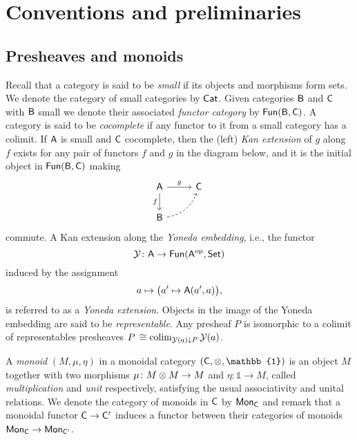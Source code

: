 
\section{Conventions and preliminaries}\label{s:preliminaries}

\subsection{Presheaves and monoids}

Recall that a category is said to be \textit{small} if its objects and morphisms form sets.
We denote the category of small categories by $\mathsf{Cat}$.
Given categories $\mathsf{B}$ and $\mathsf{C}$ with $\mathsf{B}$ small we denote their associated \textit{functor category} by $\mathsf{Fun}(\mathsf{B}, \mathsf{C})$.
A category is said to be \textit{cocomplete} if any functor to it from a small category has a colimit.
If $\mathsf{A}$ is small and $\mathsf{C}$ cocomplete, then the (left) \textit{Kan extension} of $g$ along $f$ exists for any pair of functors $f$ and $g$ in the diagram below, and it is the initial object in $\mathsf{Fun}(\mathsf{B}, \mathsf{C})$ making
\begin{equation*}
	\begin{tikzcd}[column sep=normal, row sep=normal]
		\sA \arrow[d, "f"'] \arrow[r, "g"] & \sC \\
		\sB \arrow[dashed, ur, bend right] & \quad
	\end{tikzcd}
\end{equation*}
commute.
A Kan extension along the \textit{Yoneda embedding}, i.e., the functor
\[
\operatorname{\mathcal{Y}} \colon \mathsf{A} \to \mathsf{Fun}(\mathsf{A}^{\mathrm{op}}, \mathsf{Set})
\]
induced by the assignment
\[
a \mapsto \big( a^\prime \mapsto \mathsf{A}(a^\prime, a) \big),
\]
is referred to as a \textit{Yoneda extension}.
Objects in the image of the Yoneda embedding are said to be \textit{representable}.
Any presheaf $P$ is isomorphic to a colimit of representables presheaves $P \, \cong \operatorname*{colim}_{\operatorname{\mathcal{Y}}(a) \downarrow P} \operatorname{\mathcal{Y}}(a)$.

A \textit{monoid} $(M, \mu, \eta)$ in a monoidal category $(\sC, \ot, \mathbb{1})$ is an object $M$ together with two morphisms $\mu \colon M \otimes M \to M$ and $\eta \colon \mathbb{1} \to M$, called \textit{multiplication} and \textit{unit} respectively, satisfying the usual associativity and unital relations.
We denote the category of monoids in $\mathsf{C}$ by $\mathsf{Mon}_{\mathsf{C}}$ and remark that a monoidal functor $\mathsf{C} \to \mathsf{C}^\prime$ induces a functor between their categories of monoids $\mathsf{Mon}_{\mathsf{C}} \to \mathsf{Mon}_{\mathsf{C}^\prime}$.

